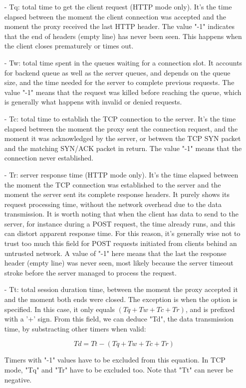 \begin{itemize}
\item[-]
    Tq: total time to get the client request (HTTP mode only). It's the time
    elapsed between the moment the client connection was accepted and the
    moment the proxy received the last HTTP header. The value "-1" indicates
    that the end of headers (empty line) has never been seen. This happens when
    the client closes prematurely or times out.
\item[-]
    Tw: total time spent in the queues waiting for a connection slot. It
    accounts for backend queue as well as the server queues, and depends on the
    queue size, and the time needed for the server to complete previous
    requests. The value "-1" means that the request was killed before reaching
    the queue, which is generally what happens with invalid or denied requests.
\item[-]
    Tc: total time to establish the TCP connection to the server. It's the time
    elapsed between the moment the proxy sent the connection request, and the
    moment it was acknowledged by the server, or between the TCP SYN packet and
    the matching SYN/ACK packet in return. The value "-1" means that the
    connection never established.
\item[-]
    Tr: server response time (HTTP mode only). It's the time elapsed between
    the moment the TCP connection was established to the server and the moment
    the server sent its complete response headers. It purely shows its request
    processing time, without the network overhead due to the data transmission.
    It is worth noting that when the client has data to send to the server, for
    instance during a POST request, the time already runs, and this can distort
    apparent response time. For this reason, it's generally wise not to trust
    too much this field for POST requests initiated from clients behind an
    untrusted network. A value of "-1" here means that the last the response
    header (empty line) was never seen, most likely because the server timeout
    stroke before the server managed to process the request.
\item[-]
    Tt: total session duration time, between the moment the proxy accepted it
    and the moment both ends were closed. The exception is when the 
    option is specified. In this case, it only equals $(Tq+Tw+Tc+Tr)$, and is
    prefixed with a '+' sign. From this field, we can deduce "Td", the data
    transmission time, by substracting other timers when valid:

       \[ Td = Tt - (Tq + Tw + Tc + Tr) \]

    Timers with "-1" values have to be excluded from this equation. In TCP
    mode, "Tq" and "Tr" have to be excluded too. Note that "Tt" can never be
    negative.
\end{itemize}

